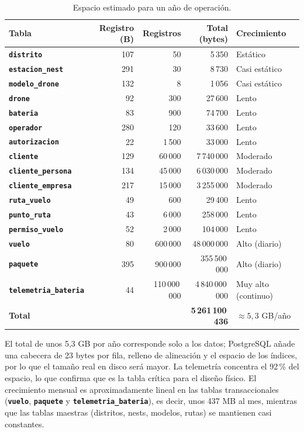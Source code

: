 \documentclass[11pt,a4paper]{article}
\newcommand{\tb}[1]{\textbf{\texttt{#1}}}
\begin{document}
\begin{table}[H]
\centering\small
\caption{Espacio estimado para un año de operación.}
\label{tab:bytes2}
\begin{tabular}{l r r r l}
\toprule
Tabla & Registro (B) & Registros & Total (bytes) & Crecimiento \\
\midrule
\tb{distrito} & 107 & 50 & 5\,350 & Estático \\
\tb{estacion\_nest} & 291 & 30 & 8\,730 & Casi estático \\
\tb{modelo\_drone} & 132 & 8 & 1\,056 & Casi estático \\
\tb{drone} & 92 & 300 & 27\,600 & Lento \\
\tb{bateria} & 83 & 900 & 74\,700 & Lento \\
\tb{operador} & 280 & 120 & 33\,600 & Lento \\
\tb{autorizacion} & 22 & 1\,500 & 33\,000 & Lento \\
\tb{cliente} & 129 & 60\,000 & 7\,740\,000 & Moderado \\
\tb{cliente\_persona} & 134 & 45\,000 & 6\,030\,000 & Moderado \\
\tb{cliente\_empresa} & 217 & 15\,000 & 3\,255\,000 & Moderado \\
\tb{ruta\_vuelo} & 49 & 600 & 29\,400 & Lento \\
\tb{punto\_ruta} & 43 & 6\,000 & 258\,000 & Lento \\
\tb{permiso\_vuelo} & 52 & 2\,000 & 104\,000 & Lento \\
\tb{vuelo} & 80 & 600\,000 & 48\,000\,000 & Alto (diario) \\
\tb{paquete} & 395 & 900\,000 & 355\,500\,000 & Alto (diario) \\
\tb{telemetria\_bateria} & 44 & 110\,000\,000 & 4\,840\,000\,000 & Muy alto (continuo) \\
\midrule
\textbf{Total} & & & \textbf{5\,261\,100\,436} & $\approx 5{,}3$ GB/año \\
\bottomrule
\end{tabular}
\end{table}

El total de unos 5,3 GB por año corresponde solo a los datos; PostgreSQL añade una cabecera de 23 bytes por fila, relleno de alineación y el espacio de los índices, por lo que el tamaño real en disco será mayor. La telemetría concentra el 92\,\% del espacio, lo que confirma que es la tabla crítica para el diseño físico. El crecimiento mensual es aproximadamente lineal en las tablas transaccionales (\tb{vuelo}, \tb{paquete} y \tb{telemetria\_bateria}), es decir, unos 437 MB al mes, mientras que las tablas maestras (distritos, nests, modelos, rutas) se mantienen casi constantes.
\end{document}
